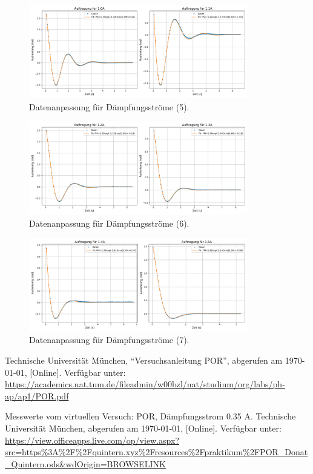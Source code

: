 \documentclass{article}
\begin{document}
\begin{figure}[H]
    \centering
    \includegraphics[width=0.85\textwidth]{Figure_5.png}
    \caption{Datenanpassung für Dämpfungsströme (5).}
    \label{fig:5}
\end{figure}
\begin{figure}[H]
    \centering
    \includegraphics[width=0.85\textwidth]{Figure_6.png}
    \caption{Datenanpassung für Dämpfungsströme (6).}
    \label{fig:6}
\end{figure}
\begin{figure}[H]
    \centering
    \includegraphics[width=0.85\textwidth]{Figure_7.png}
    \caption{Datenanpassung für Dämpfungsströme (7).}
    \label{fig:7}
\end{figure}

\clearpage


\begin{thebibliography}{9}

    Technische Universität München, ``Versuchsanleitung POR'', abgerufen am \today,
    [Online]. Verfügbar unter: \url{https://academics.nat.tum.de/fileadmin/w00bzl/nat/studium/org/labs/ph-ap/ap1/POR.pdf}

    Messwerte vom virtuellen Versuch: POR, Dämpfungsstrom 0.35 A. Technische Universität München, abgerufen am \today,
    [Online]. Verfügbar unter: \url{https://view.officeapps.live.com/op/view.aspx?src=https%3A%2F%2Fquintern.xyz%2Fresources%2Fpraktikum%2FPOR_Donat_Quintern.ods&wdOrigin=BROWSELINK}

\end{thebibliography}
\end{document}
